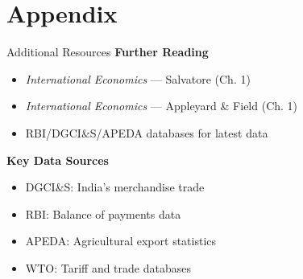 \documentclass[
  ignorenonframetext,
  aspectratio=169,
]{beamer}
\makeatletter
\providecommand{\tightlist}{%
  \setlength{\itemsep}{0pt}\setlength{\parskip}{0pt}}
\let\quarto@originallabel\label
\DeclareRobustCommand*{\label}[1]{\quarto@originallabel{#1}}
\makeatother
\begin{document}
\section{Appendix}\label{appendix}

\begin{frame}{Additional Resources}
\label{additional-resources}
\textbf{Further Reading}

\begin{itemize}
\tightlist
\item
  \emph{International Economics} --- Salvatore (Ch. 1)
\item
  \emph{International Economics} --- Appleyard \& Field (Ch. 1)
\item
  RBI/DGCI\&S/APEDA databases for latest data
\end{itemize}

\textbf{Key Data Sources}

\begin{itemize}
\tightlist
\item
  DGCI\&S: India's merchandise trade
\item
  RBI: Balance of payments data\\
\item
  APEDA: Agricultural export statistics
\item
  WTO: Tariff and trade databases
\end{itemize}
\end{frame}
\end{document}
